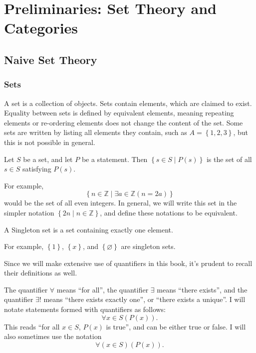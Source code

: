 \chapter{Preliminaries: Set Theory and Categories}
\section{Naive Set Theory}
\subsection{Sets}
A set is a collection of objects. Sets contain elements, which are claimed to exist. Equality between sets is defined by equivalent elements, meaning repeating elements or re-ordering elements does not change the content of the set. Some sets are written by listing all elements they contain, such as $A=\left\{ 1,2,3 \right\} $, but this is not possible in general.
\begin{definition}\label{dfn:1.1}
	Let $S$ be a set, and let $P$ be a statement. Then $\left\{ s\in S \mid P(s) \right\} $ is the set of all $s\in S$ satisfying $P(s)$.
\end{definition}
For example,
\[
	\left\{ n\in\mathbb{Z} \mid \exists a\in\mathbb{Z}\left( n=2a \right)  \right\} 
\]
would be the set of all even integers. In general, we will write this set in the simpler notation $\left\{ 2n \mid n\in\mathbb{Z} \right\} $, and define these notations to be equivalent.
\begin{definition}\label{dfn:1.2}
	A Singleton set is a set containing exactly one element.
\end{definition}
For example, $\left\{ 1 \right\} $, $\left\{ x \right\} $, and $\left\{ \varnothing \right\} $ are singleton sets.

Since we will make extensive use of quantifiers in this book, it's prudent to recall their definitions as well.
\begin{definition}[Quantifiers]\label{dfn:1.3}
	The quantifier $\forall $ means ``for all'', the quantifier $\exists $ means ``there exists'', and the quantifier $\exists !$ means ``there exists exactly one'', or ``there exists a unique''. I will notate statements formed with quantifiers as follows:
	\[
		\forall x\in S\left( P(x) \right) 
	.\]
	This reads ``for all $x\in S$, $P(x)$ is true'', and can be either true or false. I will also sometimes use the notation
	\[
		\forall \left( x\in S \right) \left( P(x) \right) 
	.\]
\end{definition}
